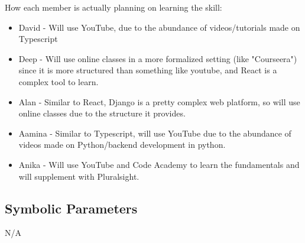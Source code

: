 \documentclass[12pt, titlepage]{article}
\begin{document}
How each member is actually planning on learning the skill:\\
\begin{itemize}
    \item David - Will use YouTube, due to the abundance of videos/tutorials made on Typescript
    \item Deep - Will use online classes in a more formalized setting (like "Courseera") since it is more structured than something like youtube, and React is a complex tool to learn.
    \item Alan - Similar to React, Django is a pretty complex web platform, so will use online classes due to the structure it provides.
    \item Aamina - Similar to Typescript, will use YouTube due to the abundance of videos made on Python/backend development in python.
    \item Anika - Will use YouTube and Code Academy to learn the fundamentals and will supplement with Pluralsight.
\end{itemize}



\subsection{Symbolic Parameters}

N/A
\end{document}
